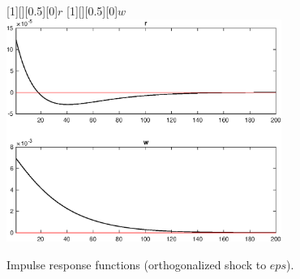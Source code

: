 \begin{figure}[H]
[1][][0.5][0]{$r$}
[1][][0.5][0]{$w$}
\centering 
\includegraphics[width=0.80\textwidth]{DyTruncation/graphs/DyTruncation_IRF_eps3}
\caption{Impulse response functions (orthogonalized shock to $eps$).}\label{Fig:IRF:eps:3}
\end{figure}
 
 
